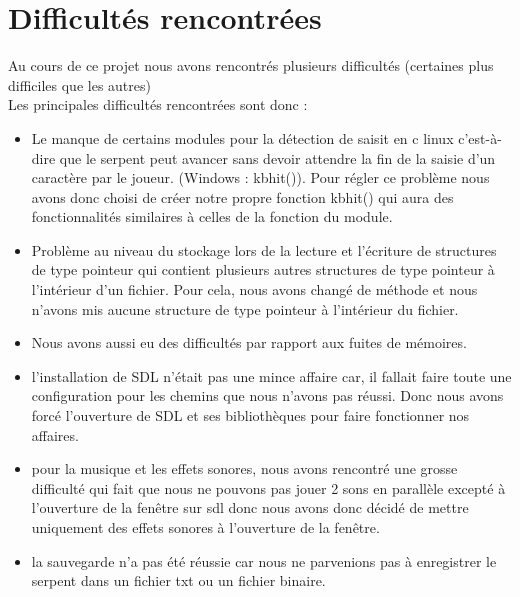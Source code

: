 \documentclass{article}
\begin{document}
\section{Difficultés rencontrées}
Au cours de ce projet nous avons rencontrés plusieurs difficultés (certaines plus difficiles que les autres)\[\]
Les principales difficultés rencontrées sont donc :
\begin{itemize}
    \item Le manque de certains modules pour la détection de saisit en c linux c'est-à-dire que le serpent peut avancer sans devoir attendre la fin de la saisie d'un caractère par le joueur. (Windows : kbhit()). Pour régler ce problème nous avons donc choisi de créer notre propre fonction kbhit() qui aura des fonctionnalités similaires à celles de la fonction du module.
    \item Problème au niveau du stockage lors de la lecture et l'écriture de structures de type pointeur qui contient plusieurs autres structures de type pointeur à l’intérieur d'un fichier. Pour cela, nous avons changé de méthode et nous n'avons mis aucune structure de type pointeur à l'intérieur du fichier.
    \item Nous avons aussi eu des difficultés par rapport aux fuites de mémoires.
    \item l'installation de SDL n’était pas une mince affaire car, il fallait faire toute une configuration pour les chemins que nous n’avons pas réussi. Donc nous avons forcé l’ouverture de SDL et ses bibliothèques pour faire fonctionner nos affaires.
    \item pour la musique et les effets sonores, nous avons rencontré une grosse difficulté qui fait que nous ne pouvons pas jouer 2 sons en parallèle excepté à l’ouverture de la fenêtre sur sdl donc nous avons donc décidé de mettre uniquement des effets sonores à l’ouverture de la fenêtre.
    \item  la sauvegarde n’a pas été réussie car nous ne parvenions pas à enregistrer le serpent dans un fichier txt ou un fichier binaire.

\end{itemize}
\end{document}
